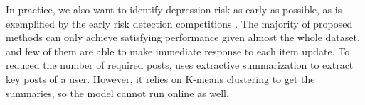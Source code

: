 In practice, we also want to identify depression risk as early as possible, as is exemplified by the early risk detection competitions \citep{losada2019overview}. The majority of proposed methods can only achieve satisfying performance given almost the whole dataset, and few of them are able to make immediate response to each item update. To reduced the number of required posts, \citet{zogan2021depressionnet} uses extractive summarization to extract key posts of a user. However, it relies on K-means clustering to get the summaries, so the model cannot run online as well. 

